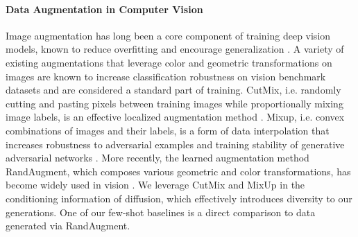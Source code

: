 \paragraph{Data Augmentation in Computer Vision}
Image augmentation has long been a core component of training deep vision models, known to reduce overfitting and encourage generalization \citep{imagenet_classification, rand_aug, mixup, cutmix}. A variety of existing augmentations that leverage color and geometric transformations on images are known to increase classification robustness on vision benchmark datasets and are considered a standard part of training. 
CutMix, i.e. randomly cutting and pasting pixels between training images while proportionally mixing image labels, is an effective localized augmentation method \citep{cutmix}.
Mixup, i.e. convex combinations of images and their labels, is a form of data interpolation that increases robustness to adversarial examples and training stability of generative adversarial networks \citep{mixup}.
More recently, the learned augmentation method RandAugment, which composes various geometric and color transformations, has become widely used in vision \citep{rand_aug}. 
We leverage CutMix and MixUp in the conditioning information of diffusion, which effectively introduces diversity to our generations. One of our few-shot baselines is a direct comparison to data generated via RandAugment. 
